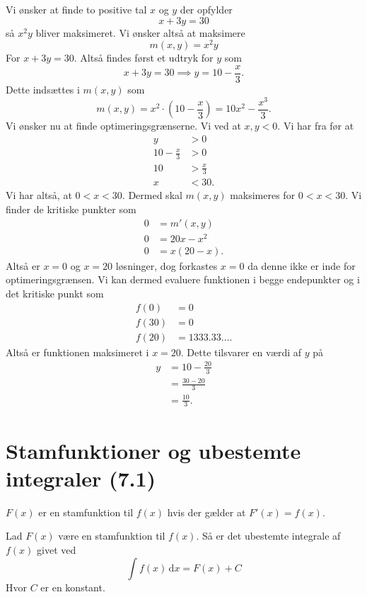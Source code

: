 \begin{eks} 
  Vi ønsker at finde to positive tal $x$ og $y$ der opfylder
  \[ 
  x + 3y = 30
  \]
  så $x^2y$ bliver maksimeret.
  \bigbreak
  Vi ønsker altså at maksimere
  \[ 
  m(x,y) = x^2y
  \]
  For $x+3y = 30$. Altså findes først et udtryk for $y$ som
  \[ 
  x + 3y = 30 \implies y = 10 - \frac{x}{3}
  .\]
  Dette indsættes i $m(x,y)$ som
  \[ 
  m(x,y) = x^2 \cdot \left( 10 - \frac{x}{3} \right) = 10x^2 - \frac{x^3}{3}
  .\]
  Vi ønsker nu at finde optimeringsgrænserne. Vi ved at $x, y < 0$. Vi har fra før at
  \begin{align*}
    y &> 0 \\
    10 - \frac{x}{3} &> 0 \\
    10 &> \frac{x}{3} \\
    x &< 30
  .\end{align*}
  Vi har altså, at $0 < x < 30$. Dermed skal $m(x,y)$ maksimeres for $0 < x < 30$. Vi finder de kritiske punkter som
  \begin{align*}
    0 &= m'(x,y) \\
    0 &= 20x - x^2 \\
    0 &= x(20 - x)
  .\end{align*}
  Altså er $x = 0$ og $x = 20$ løsninger, dog forkastes $x = 0$ da denne ikke er inde for optimeringsgrænsen. Vi kan dermed evaluere funktionen i begge endepunkter og i det kritiske punkt som
  \begin{align*}
    f(0) &= 0 \\
    f(30) &= 0 \\
    f(20) &= \num{1333,33}\ldots  
  .\end{align*}
  Altså er funktionen maksimeret i $x = 20$. Dette tilsvarer en værdi af $y$ på
  \begin{align*}
    y &= 10 - \frac{20}{3} \\
    &= \frac{30-20}{3} \\
    &= \frac{10}{3}
  .\end{align*}
\end{eks}

\section{Stamfunktioner og ubestemte integraler (7.1)}
\begin{definition} [Stamfunktion]
  $F(x)$ er en stamfunktion til $f(x)$ hvis der gælder at $F'(x) = f(x)$.
\end{definition}

\begin{definition} 
  Lad $F(x)$ være en stamfunktion til $f(x)$. Så er det ubestemte integrale af $f(x)$ givet ved
  \[ 
  \int f(x) \, \mathrm{d}x  = F(x) + C
  \]
  Hvor $C$ er en konstant.
\end{definition}

